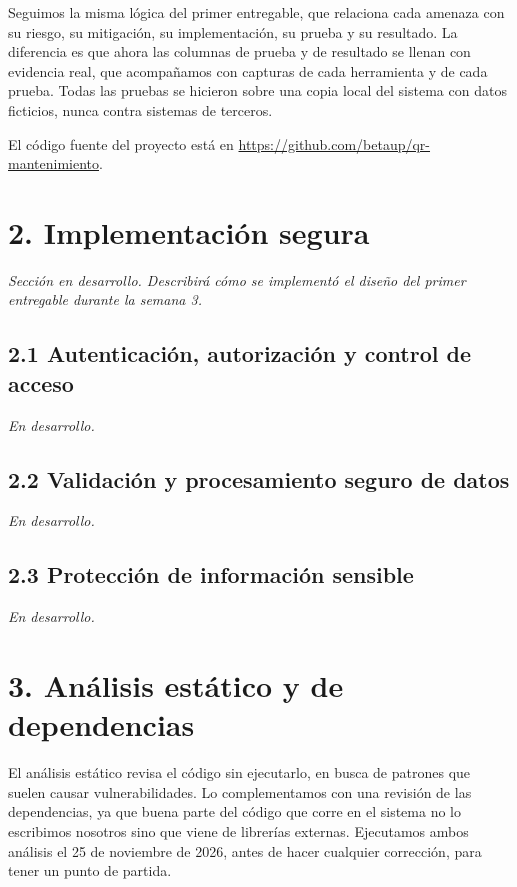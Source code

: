 \documentclass[12pt, letterpaper]{article}
\begin{document}
Seguimos la misma lógica del primer entregable, que relaciona cada amenaza con su riesgo, su mitigación, su implementación, su prueba y su resultado. La diferencia es que ahora las columnas de prueba y de resultado se llenan con evidencia real, que acompañamos con capturas de cada herramienta y de cada prueba. Todas las pruebas se hicieron sobre una copia local del sistema con datos ficticios, nunca contra sistemas de terceros.

El código fuente del proyecto está en \url{https://github.com/betaup/qr-mantenimiento}.

\section{2. Implementación segura}

\textit{Sección en desarrollo. Describirá cómo se implementó el diseño del primer entregable durante la semana 3.}

\subsection{2.1 Autenticación, autorización y control de acceso}

\textit{En desarrollo.}

\subsection{2.2 Validación y procesamiento seguro de datos}

\textit{En desarrollo.}

\subsection{2.3 Protección de información sensible}

\textit{En desarrollo.}

\section{3. Análisis estático y de dependencias}

El análisis estático revisa el código sin ejecutarlo, en busca de patrones que suelen causar vulnerabilidades. Lo complementamos con una revisión de las dependencias, ya que buena parte del código que corre en el sistema no lo escribimos nosotros sino que viene de librerías externas. Ejecutamos ambos análisis el 25 de noviembre de 2026, antes de hacer cualquier corrección, para tener un punto de partida.
\end{document}
